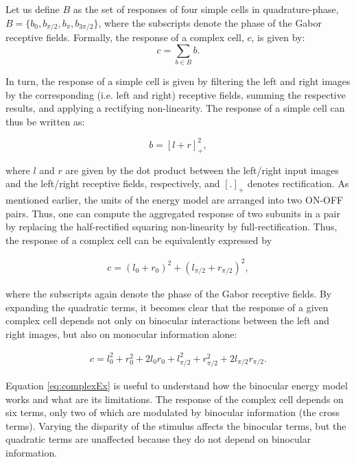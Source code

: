 Let us define $B$ as the set of responses of four simple cells in quadrature-phase, $B=\{b_{0}, b_{\pi/2}, b_{\pi}, b_{3\pi/2}\}$, where the subscripts denote the phase of the Gabor receptive fields. Formally, the response of a complex cell, $c$, is given by:
\begin{equation}
c = \sum_{b \in B} b.
\label{eq:complex}
\end{equation}

In turn, the response of a simple cell is given by filtering the left and right images by the corresponding (i.e. left and right) receptive fields, summing the respective results, and applying a rectifying non-linearity. The response of a simple cell can thus be written as:

\begin{equation}
b = [l + r]_{+}^2,
\label{eq:simple}
\end{equation}

where $l$ and $r$ are given by the dot product between the left/right input images and the left/right receptive fields, respectively, and $[.]_+$ denotes rectification. As mentioned earlier, the units of the energy model are arranged into two ON-OFF pairs. Thus, one can compute the aggregated response of two subunits in a pair by replacing the half-rectified squaring non-linearity by full-rectification. Thus, the response of a complex cell can be equivalently expressed by

\begin{eqnarray}
c = (l_{0} + r_{0})^2 + (l_{\pi/2} + r_{\pi/2})^2,
\end{eqnarray}

where the subscripts again denote the phase of the Gabor receptive fields. By expanding the quadratic terms, it becomes clear that the response of a given complex cell depends not only on binocular interactions between the left and right images, but also on monocular information alone:  

\begin{eqnarray}
c = l_{0}^2 + r_{0}^2 + 2l_{0}r_{0} + l_{\pi/2}^2 + r_{\pi/2}^2 + 2l_{\pi/2}r_{\pi/2}.
\label{eq:complexEx}
\end{eqnarray}

Equation \ref{eq:complexEx} is useful to understand how the binocular energy model works and what are its limitations. The response of the complex cell depends on six terms, only two of which are modulated by binocular information (the cross terms). Varying the disparity of the stimulus affects the binocular terms, but the quadratic terms are unaffected because they do not depend on binocular information.

